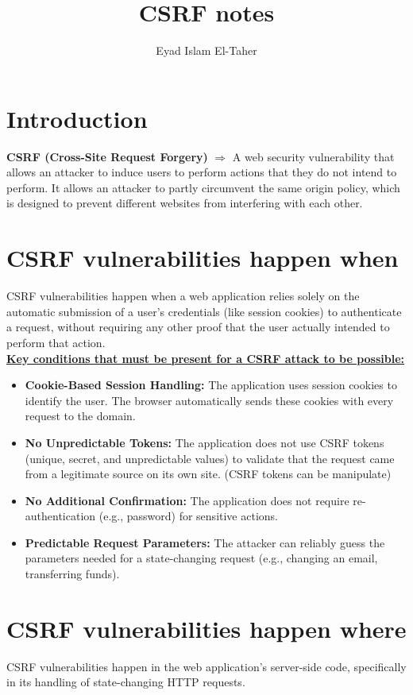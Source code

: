 \documentclass{article}
\title{CSRF notes}
\author{Eyad Islam El-Taher}
\begin{document}
\maketitle

\section*{Introduction}
\textbf {CSRF (Cross-Site Request Forgery)} $\Longrightarrow$ A web security vulnerability that allows an attacker to induce users to perform actions that they do not intend to perform. It allows an attacker to partly circumvent the same origin policy, which is designed to prevent different websites from interfering with each other. 

\section*{CSRF vulnerabilities happen when}
CSRF vulnerabilities happen when a web application relies solely on the automatic submission of a user's credentials (like session cookies) to authenticate a request, without requiring any other proof that the user actually intended to perform that action.\\

\vspace{5px}
\textbf{\underline{Key conditions that must be present for a CSRF attack to be possible:}}
\begin{itemize}
    \item \textbf{Cookie-Based Session Handling:} The application uses session cookies to identify the user. The browser automatically sends these cookies with every request to the domain.
    \item \textbf{No Unpredictable Tokens:} The application does not use CSRF tokens (unique, secret, and unpredictable values) to validate that the request came from a legitimate source on its own site.  (CSRF tokens can be manipulate)
    \item \textbf{No Additional Confirmation:} The application does not require re-authentication (e.g., password) for sensitive actions.
    	\item \textbf{Predictable Request Parameters:} The attacker can reliably guess the parameters needed for a state-changing request (e.g., changing an email, transferring funds).
\end{itemize}

\section*{CSRF vulnerabilities happen where}
CSRF vulnerabilities happen in the web application's server-side code, specifically in its handling of state-changing HTTP requests.
\end{document}
